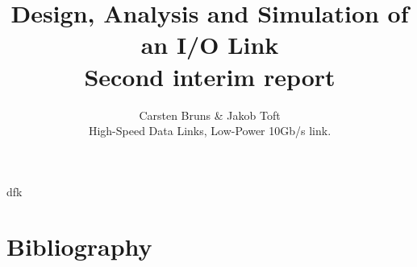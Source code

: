 \documentclass[12pt,journal,compsoc,onecolumn]{IEEEtran}
\begin{document}
%
\title{Design, Analysis and Simulation of an I/O Link\\Second interim report}

\author{Carsten Bruns
        \& Jakob Toft%



\begin{IEEEkeywords}
High-Speed Data Links, Low-Power 10Gb/s link.
\end{IEEEkeywords}}


\maketitle

\IEEEdisplaynotcompsoctitleabstractindextext
\IEEEpeerreviewmaketitle

dfk\cite{rajesh2011a} %
%


%



\ifCLASSOPTIONcaptionsoff
  \newpage
\fi

\newpage
\section{Bibliography}
{}

\end{document}
